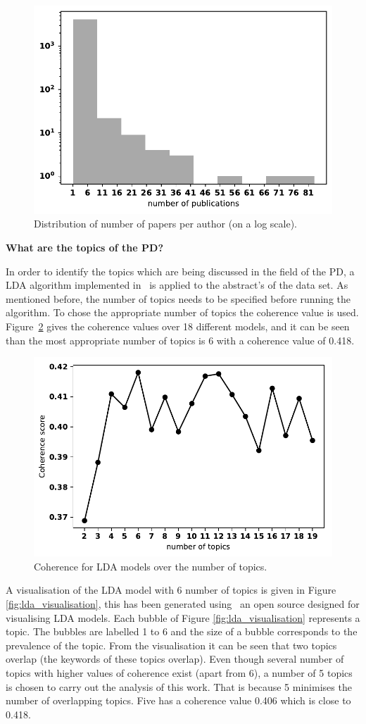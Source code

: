 \documentclass{article}
\theoremstyle{definition}
\begin{document}
\begin{figure}[!hbtp]
    \centering
    \includegraphics[width=.50\textwidth]{./assets/images/papers_per_author.pdf}
    \caption{Distribution of number of papers per author (on a log scale).}
    \label{fig:num_papers_per_author}
\end{figure}

\textbf{What are the topics of the PD?}

In order to identify the topics which are being discussed in the field of
the PD, a LDA algorithm implemented in~\cite{rehurek_lrec} is applied to the
abstract's of the
data set. As mentioned before, the number of topics needs to be specified before
running the algorithm. To chose the appropriate number of topics the coherence
value is used. Figure~\ref{fig:coherence_value_over_number_of_topcis}
gives the coherence values over 18 different models, and it can be seen than
the most appropriate number of topics is 6 with a coherence value
of 0.418.

\begin{figure}[!hbtp]
    \centering
    \includegraphics[width=.5\textwidth]{./assets/images/coherence_values.pdf}
    \caption{Coherence for LDA models over the number of topics.}
    \label{fig:coherence_value_over_number_of_topcis}
\end{figure}

A visualisation of the LDA model with 6 number of topics is given in Figure
\ref{fig:lda_visualisation}, this has been generated using~\cite{Sievert2014}
an open source designed for visualising LDA models. Each bubble of Figure
\ref{fig:lda_visualisation} represents a topic. The bubbles are labelled 1 to
6 and the size of a bubble corresponds to the prevalence of the topic.
From the visualisation it can be seen that two topics overlap (the keywords
of these topics overlap). Even though several number of topics with higher
values of coherence exist (apart from 6), a number of 5 topics is chosen
to carry out the analysis of this work. That is because 5 minimises the
number of overlapping topics. Five has a coherence value 0.406 which is close
to 0.418.
\end{document}
